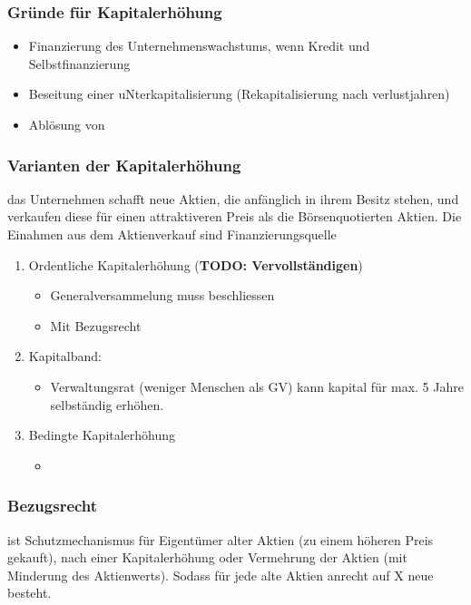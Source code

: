\subsubsection{Gründe für Kapitalerhöhung}
\begin{itemize}
    \item Finanzierung des Unternehmenswachstums, wenn Kredit und Selbstfinanzierung 
    \item Beseitung einer uNterkapitalisierung (Rekapitalisierung nach verlustjahren)
    \item Ablösung von 
\end{itemize}

\subsubsection{Varianten der Kapitalerhöhung}

\begin{definition}
    [Kapitalerhöhung] das Unternehmen schafft neue Aktien, die anfänglich in ihrem Besitz stehen, und verkaufen diese für einen attraktiveren Preis als die Börsenquotierten Aktien. Die Einahmen aus dem Aktienverkauf sind Finanzierungsquelle
\end{definition}
\begin{enumerate}
    \item Ordentliche Kapitalerhöhung (\textbf{TODO: Vervollständigen})
    \begin{itemize}
        \item Generalversammelung muss beschliessen 
        \item Mit Bezugsrecht
    \end{itemize}
    \item Kapitalband:
    \begin{itemize}
        \item Verwaltungsrat (weniger Menschen als GV) kann kapital für max. 5 Jahre selbständig erhöhen.
    \end{itemize}
    \item Bedingte Kapitalerhöhung
    \begin{itemize}
        \item 
    \end{itemize}
\end{enumerate}

\subsubsection{Bezugsrecht}
\begin{definition}
    [Bezugsrecht] ist Schutzmechanismus für Eigentümer alter Aktien (zu einem höheren Preis gekauft), nach einer Kapitalerhöhung oder Vermehrung der Aktien (mit Minderung des Aktienwerts). Sodass für jede alte Aktien anrecht auf X neue besteht.
\end{definition}

